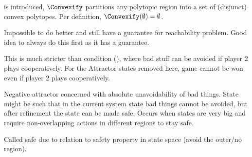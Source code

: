     is introduced, 
    $\Convexify$ partitions any polytopic region into a set of (disjunct) convex polytopes.
    Per definition, $\Convexify(\emptyset) = \emptyset$.

    Impossible to do better and still have a guarantee for reachability problem.
    Good idea to always do this first as it has a guarantee.

    This is much stricter than condition (), where bad stuff can be avoided if player 2 plays cooperatively.
    For the Attractor states removed here, game cannot be won even if player 2 plays cooperatively.

\stopsubsection


    \startalgorithmic[numbering=no,margin=0em]
    \stopalgorithmic
    \startalgorithmic
                    \ELSE
                    \ENDIF
                \ENDFOR
            \ENDIF
        \ENDFOR
    \stopalgorithmic
\stopbuffer

\startsubsection[title={Safety}]


    Negative attractor concerned with absolute unavoidability of bad things.
    State might be such that in the current system state bad things cannot be avoided, but after refinement the state can be made safe.
    Occurs when states are very big and require non-overlapping actions in different regions to stay safe.

    Called safe due to relation to safety property in state space (avoid the outer/no region).

